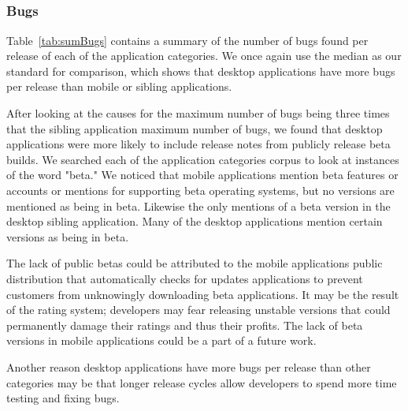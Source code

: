 \documentclass{acm_proc_article-sp}
\begin{document}
\subsection{\RQThree }



\subsubsection{Bugs}

\begin{center}

\label{tab:sumBugs}
\end{center}

\begin{center}

\label{tab:bugs}
\end{center}

Table~\ref{tab:sumBugs} contains a summary of the number of bugs found per release of each of the application categories. 
We once again use the median as our standard for comparison, which shows that desktop applications have more bugs per release than mobile or sibling applications. 

After looking at the causes for the maximum number of bugs being three times that the sibling application maximum number of bugs, we found that desktop applications were more likely to include release notes from publicly release beta builds. 
We searched each of the application categories corpus to look at instances of the word "beta."
We noticed that mobile applications mention beta features or accounts or mentions for supporting beta operating systems, but no versions are mentioned as being in beta. 
Likewise the only mentions of a beta version in the desktop sibling application.
Many of the desktop applications mention certain versions as being in beta.

The lack of public betas could be attributed to the mobile applications public distribution that automatically checks for updates applications to prevent customers from unknowingly downloading beta applications. 
It may be the result of the rating system; developers may fear releasing unstable versions that could permanently damage their ratings and thus their profits. 
The lack of beta versions in mobile applications could be a part of a future work.

Another reason desktop applications have more bugs per release than other categories may be that longer release cycles allow developers to spend more time testing and fixing bugs. 
\end{document}

